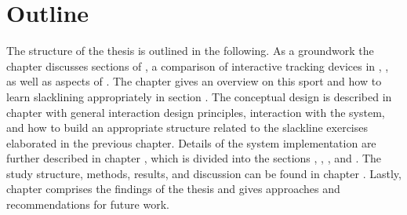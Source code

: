 \section{Outline}
The structure of the thesis is outlined in the following.
As a groundwork the \textit{} chapter discusses sections of \textit{}, a comparison of interactive tracking devices in \textit{}, \textit{}, as well as aspects of \textit{}.
The chapter \textit{} gives an overview on this sport and how to learn slacklining appropriately in section \textit{}.
The conceptual design is described in chapter \textit{} with general interaction design principles, interaction with the system, and how to build an appropriate structure related to the slackline exercises elaborated in the previous chapter.
Details of the system implementation are further described in chapter \textit{}, which is divided into the sections \textit{}, \textit{}, \textit{}, and \textit{}.
The study structure, methods, results, and discussion can be found in chapter \textit{}. Lastly, chapter \textit{} comprises the findings of the thesis and gives approaches and recommendations for future work.

\begin{comment}
The thesis is structured as follows:
As a groundwork the \textbf{\nameref{2_relatedWork}} chapter involves basics of \textbf{\nameref{2_2_slacklineTraining}}, a number of possible interactive tracking devices that will be compared in the section \textbf{\nameref{2_3_interactiveTechnology}}, and \textbf{\nameref{2_4_methods}}.

- \todo{Further chapters}

A List of \textbf{\nameref{tablesRef}}, \textbf{\nameref{listFiguresRef}}, \textbf{\nameref{listAbbreviationsRef}} and the \textbf{\nameref{bibliographyRef}}  can be found at the end of the thesis.

\end{comment}